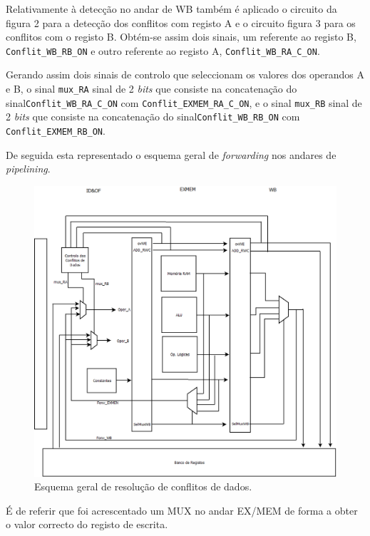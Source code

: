 \documentclass[11pt]{article}
\numberwithin{equation}{section}
\begin{document}
Relativamente à detecção no andar de WB também é aplicado o circuito da figura 2 para a detecção dos conflitos com registo A e o circuito figura 3 para os conflitos com o registo B. Obtém-se assim dois sinais, um referente ao registo B, \texttt{Conflit\_WB\_RB\_ON} e outro referente ao registo A, \texttt{Conflit\_WB\_RA\_C\_ON}.

Gerando assim dois sinais de controlo que seleccionam os valores dos operandos A e B, o sinal \texttt{mux\_RA} sinal de 2 \textit{bits} que consiste na concatenação do sinal\texttt{Conflit\_WB\_RA\_C\_ON} com \texttt{Conflit\_EXMEM\_RA\_C\_ON}, e  o sinal \texttt{mux\_RB} sinal de 2 \textit{bits} que consiste na concatenação do sinal\texttt{Conflit\_WB\_RB\_ON} com \texttt{Conflit\_EXMEM\_RB\_ON}.

De seguida esta representado o esquema geral de \textit{forwarding} nos andares de \textit{pipelining}.

\begin{figure}[H]
	\centering
	\includegraphics[keepaspectratio=true, scale=0.27]{imagens/DetecaodeconflitoGeral}
	\vspace{-0.5em}
	\caption{Esquema geral de resolução de conflitos de dados.}
	\vspace{-0.8em}
\end{figure} 

É de referir que foi acrescentado um MUX no andar EX/MEM de forma a obter o valor correcto do registo de escrita.
\end{document}
